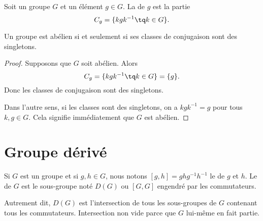 \begin{definition}
    Soit un groupe \( G\) et un élément \( g\in G\). La  de \( g\) est la partie
    \begin{equation}
        C_g=\{ kgk^{-1}\tq k\in G \}.
    \end{equation}
\end{definition}

\begin{lemma}       \label{LEMooQYBJooYwMwGM}
    Un groupe est abélien si et seulement si ses classes de conjugaison sont des singletons.
\end{lemma}

\begin{proof}
    Supposons que \( G\) soit abélien. Alors
    \begin{equation}
        C_g=\{ kgk^{-1}\tq k\in G \}=\{ g \}.
    \end{equation}
    Donc les classes de conjugaison sont des singletons.

    Dans l'autre sens, si les classes sont des singletons, on a \( kgk^{-1}=g\) pour tous \( k,g\in G\). Cela signifie immédiatement que \( G\) est abélien.
\end{proof}

\section{Groupe dérivé}

\begin{definition}\label{DefVUFBooNQjEdn}
    Si \( G\) est un groupe et si \( g,h\in G\), nous notons \( [g,h]=ghg^{-1}h^{-1}\) le  de \( g\) et \( h\). Le  de \( G\) est le sous-groupe noté \( D(G)\) ou \( [G,G]\) engendré par les commutateurs.
\end{definition}
Autrement dit, \( D(G)\) est l'intersection de tous les sous-groupes de \( G\) contenant tous les commutateurs. Intersection non vide parce que \( G\) lui-même en fait partie.


